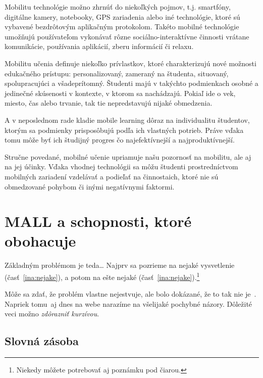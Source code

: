 \documentclass[10pt,twoside,slovak,a4paper]{article}
\begin{document}
Mobilitu technológie možno zhrnúť do niekoľkých pojmov, t.j. smartfóny, digitálne kamery, notebooky, GPS zariadenia alebo iné technológie, ktoré sú vybavené bezdrôtovým aplikačným protokolom. Takéto mobilné technológie umožňujú používateľom vykonávať rôzne sociálno-interaktívne činnosti vrátane komunikácie, používania aplikácií, zberu informácií či relaxu\cite{Kim2012}.

Mobilitu učenia definuje niekoľko prívlastkov, ktoré charakterizujú nové možnosti edukačného prístupu: personalizovaný, zameraný na študenta, situovaný, spolupracujúci a všadeprítomný. Študenti majú v takýchto podmienkach osobné a jedinečné skúsenosti v kontexte, v ktorom sa nachádzajú. Pokiaľ ide o vek, miesto, čas alebo trvanie, tak tie nepredstavujú nijaké obmedzenia\cite{Kim2012}. 

A v neposlednom rade kladie mobile learning dôraz na individualitu študentov, ktorým sa podmienky prisposôbujú podľa ich vlastných potrieb. Práve vďaka tomu môže byť ich študijný progres čo najefektívnejší a najproduktívnejší.

Stručne povedané, mobilné učenie upriamuje našu pozornosť na mobilitu, ale aj na jej účinky. Vďaka vhodnej technológii sa môžu študenti prostredníctvom mobilných zariadení vzdelávať a podieľať na činnostaich, ktoré nie sú obmedzované pohybom či inými negatívnymi faktormi.



\section{MALL a schopnosti, ktoré obohacuje} \label{mall}

Základným problémom je teda\ldots{} Najprv sa pozrieme na nejaké vysvetlenie (časť~\ref{ina:nejake}), a potom na ešte nejaké (časť~\ref{ina:nejake}).\footnote{Niekedy môžete potrebovať aj poznámku pod čiarou.}

Môže sa zdať, že problém vlastne nejestvuje\cite{Miangah2012}, ale bolo dokázané, že to tak nie je~\cite{KukulskaHulme2009}. Napriek tomu\, aj dnes na webe narazíme na všelijaké pochybné názory\cite{Kim2012}. Dôležité veci\cite{Azar2014} možno \emph{zdôrazniť kurzívou}.


\subsection{Slovná zásoba} \label{mall:slovnazasoba}
\end{document}
